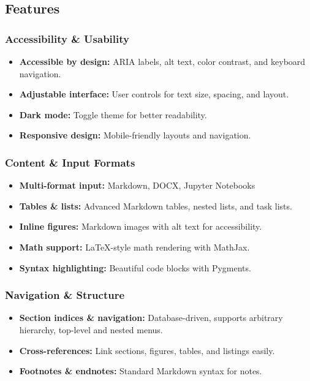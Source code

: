 \subsection{Features}\label{features}

\subsubsection{Accessibility \&
Usability}\label{accessibility-usability}

\begin{itemize}
\tightlist
\item
  \textbf{Accessible by design:} ARIA labels, alt text, color contrast,
  and keyboard navigation.
\item
  \textbf{Adjustable interface:} User controls for text size, spacing,
  and layout.
\item
  \textbf{Dark mode:} Toggle theme for better readability.
\item
  \textbf{Responsive design:} Mobile-friendly layouts and navigation.
\end{itemize}

\subsubsection{Content \& Input Formats}\label{content-input-formats}

\begin{itemize}
\tightlist
\item
  \textbf{Multi-format input:} Markdown, DOCX, Jupyter Notebooks
\item
  \textbf{Tables \& lists:} Advanced Markdown tables, nested lists, and
  task lists.
\item
  \textbf{Inline figures:} Markdown images with alt text for
  accessibility.
\item
  \textbf{Math support:} LaTeX-style math rendering with MathJax.
\item
  \textbf{Syntax highlighting:} Beautiful code blocks with Pygments.
\end{itemize}

\subsubsection{Navigation \& Structure}\label{navigation-structure}

\begin{itemize}
\tightlist
\item
  \textbf{Section indices \& navigation:} Database-driven, supports
  arbitrary hierarchy, top-level and nested menus.
\item
  \textbf{Cross-references:} Link sections, figures, tables, and
  listings easily.
\item
  \textbf{Footnotes \& endnotes:} Standard Markdown syntax for notes.
\end{itemize}

